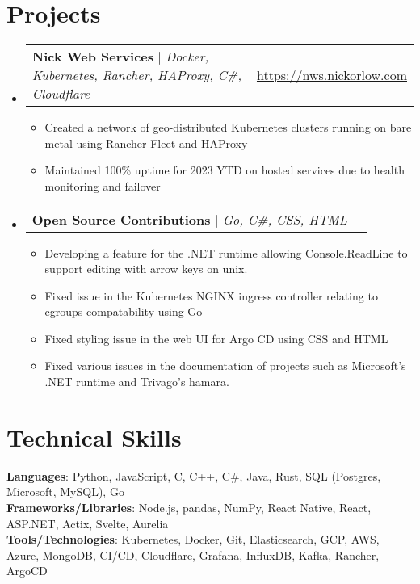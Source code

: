 \documentclass[letterpaper,11pt]{article}
\makeatletter
\newcommand{\resumeItem}[1]{
  \item\small{
    {#1 \vspace{-2pt}}
  }
}
\newcommand{\resumeProjectHeading}[2]{
    \item
    \begin{tabular*}{0.97\textwidth}{l@{\extracolsep{\fill}}r}
      \small#1 & \underline{\href{#2}{#2}} \\
    \end{tabular*}\vspace{-7pt}
}
\newcommand{\resumeSubHeadingListStart}{\begin{itemize}[leftmargin=0.15in, label={}]}
\newcommand{\resumeSubHeadingListEnd}{\end{itemize}}
\newcommand{\resumeItemListStart}{\begin{itemize}}
\newcommand{\resumeItemListEnd}{\end{itemize}\vspace{-3pt}}
\makeatother
\begin{document}
\section{Projects}
    \resumeSubHeadingListStart
      \resumeProjectHeading
          {\textbf{Nick Web Services} $|$ \emph{Docker, Kubernetes, Rancher, HAProxy, C\#, Cloudflare}}{https://nws.nickorlow.com}
          \resumeItemListStart
            \resumeItem{Created a network of geo-distributed Kubernetes clusters running on bare metal using Rancher Fleet and HAProxy}
            \resumeItem{Maintained 100\% uptime for 2023 YTD on hosted services due to health monitoring and failover}
          \resumeItemListEnd
          \resumeProjectHeading
          {\textbf{Open Source Contributions} $|$ \emph{Go, C\#, CSS, HTML}}{}
          \resumeItemListStart
            \resumeItem{Developing a feature for the .NET runtime allowing Console.ReadLine to support editing with arrow keys on unix.}
            \resumeItem{Fixed issue in the Kubernetes NGINX ingress controller relating to cgroups compatability using Go}
            \resumeItem{Fixed styling issue in the web UI for Argo CD using CSS and HTML}
            \resumeItem{Fixed various issues in the documentation of projects such as Microsoft's .NET runtime and Trivago's hamara.}
          \resumeItemListEnd
    \resumeSubHeadingListEnd

\section{Technical Skills}
 \begin{itemize}[leftmargin=0.15in, label={}]
    \small{\item{
     \textbf{Languages}{:  Python, JavaScript, C, C++, C\#, Java, Rust, SQL (Postgres, Microsoft, MySQL), Go} \\
     \textbf{Frameworks/Libraries}{: Node.js, pandas, NumPy, React Native, React, ASP.NET, Actix, Svelte, Aurelia} \\
     \textbf{Tools/Technologies}{: Kubernetes, Docker, Git, Elasticsearch, GCP, AWS, Azure, MongoDB, CI/CD, Cloudflare, Grafana, InfluxDB, Kafka, Rancher, ArgoCD} \\
    }}
 \end{itemize}


\end{document}
